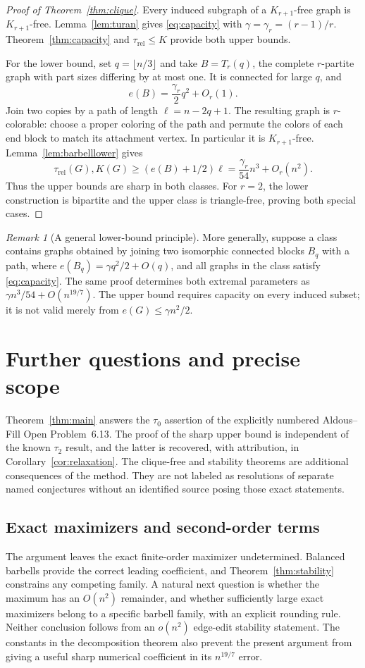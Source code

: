 \documentclass[11pt]{amsart}
\numberwithin{equation}{section}
\theoremstyle{definition}
\theoremstyle{remark}
\newtheorem{remark}[theorem]{Remark}
\newcommand{\trel}{\tau_{\mathrm{rel}}}
\begin{document}
\begin{proof}[Proof of Theorem~\ref{thm:clique}]
Every induced subgraph of a $K_{r+1}$-free graph is $K_{r+1}$-free. Lemma~\ref{lem:turan} gives \eqref{eq:capacity} with $\gamma=\gamma_r=(r-1)/r$. Theorem~\ref{thm:capacity} and $\trel\le K$ provide both upper bounds.

For the lower bound, set $q=\lfloor n/3\rfloor$ and take $B=T_r(q)$, the complete $r$-partite graph with part sizes differing by at most one. It is connected for large $q$, and
\[
e(B)=\frac{\gamma_r}{2}q^2+O_r(1).
\]
Join two copies by a path of length $\ell=n-2q+1$. The resulting graph is $r$-colorable: choose a proper coloring of the path and permute the colors of each end block to match its attachment vertex. In particular it is $K_{r+1}$-free. Lemma~\ref{lem:barbelllower} gives
\[
\trel(G),K(G)\ge(e(B)+1/2)\ell
=\frac{\gamma_r}{54}n^3+O_r(n^2).
\]
Thus the upper bounds are sharp in both classes. For $r=2$, the lower construction is bipartite and the upper class is triangle-free, proving both special cases.
\end{proof}

\begin{remark}[A general lower-bound principle]
More generally, suppose a class contains graphs obtained by joining two isomorphic connected blocks $B_q$ with a path, where $e(B_q)=\gamma q^2/2+O(q)$, and all graphs in the class satisfy \eqref{eq:capacity}. The same proof determines both extremal parameters as $\gamma n^3/54+O(n^{19/7})$. The upper bound requires capacity on every induced subset; it is not valid merely from $e(G)\le\gamma n^2/2$.
\end{remark}

\section{Further questions and precise scope}\label{sec:scope}
Theorem~\ref{thm:main} answers the $\tau_0$ assertion of the explicitly numbered Aldous--Fill Open Problem~6.13. The proof of the sharp upper bound is independent of the known $\tau_2$ result, and the latter is recovered, with attribution, in Corollary~\ref{cor:relaxation}. The clique-free and stability theorems are additional consequences of the method. They are not labeled as resolutions of separate named conjectures without an identified source posing those exact statements.

\subsection{Exact maximizers and second-order terms}
The argument leaves the exact finite-order maximizer undetermined. Balanced barbells provide the correct leading coefficient, and Theorem~\ref{thm:stability} constrains any competing family. A natural next question is whether the maximum has an $O(n^2)$ remainder, and whether sufficiently large exact maximizers belong to a specific barbell family, with an explicit rounding rule. Neither conclusion follows from an $o(n^2)$ edge-edit stability statement. The constants in the decomposition theorem also prevent the present argument from giving a useful sharp numerical coefficient in its $n^{19/7}$ error.
\end{document}
